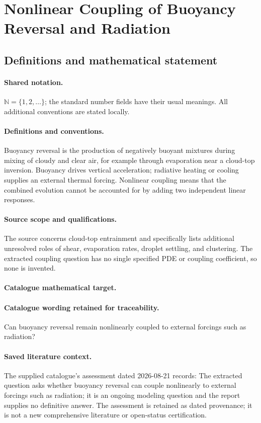 \documentclass[11pt]{article}
\begin{document}
\section{Nonlinear Coupling of Buoyancy Reversal and Radiation}\label{statement}

\subsection{Definitions and mathematical statement}

\paragraph{Shared notation.}$\mathbb N=\{1,2,\ldots\}$; the standard number fields have their usual meanings. All additional conventions are stated locally.


\paragraph{Definitions and conventions.} Buoyancy reversal is the production of negatively buoyant mixtures during mixing of cloudy and clear air, for example through evaporation near a cloud-top inversion. Buoyancy drives vertical acceleration; radiative heating or cooling supplies an external thermal forcing. Nonlinear coupling means that the combined evolution cannot be accounted for by adding two independent linear responses.

\paragraph{Source scope and qualifications.} The source concerns cloud-top entrainment and specifically lists additional unresolved roles of shear, evaporation rates, droplet settling, and clustering. The extracted coupling question has no single specified PDE or coupling coefficient, so none is invented.

\paragraph{Catalogue mathematical target.}
\paragraph{Catalogue wording retained for traceability.}
Can buoyancy reversal remain nonlinearly coupled to external forcings such as radiation?

\paragraph{Saved literature context.} The supplied catalogue's assessment dated 2026-08-21 records: The extracted question asks whether buoyancy reversal can couple nonlinearly to external forcings such as radiation; it is an ongoing modeling question and the report supplies no definitive answer. The assessment is retained as dated provenance; it is not a new comprehensive literature or open-status certification.
\end{document}
